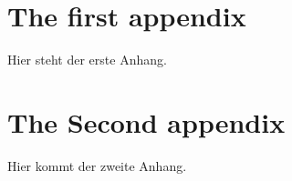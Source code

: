 \begin{appendix}


\chapter{The first appendix}

Hier steht der erste Anhang.


\chapter{The Second appendix}

Hier kommt der zweite Anhang.


\end{appendix}
